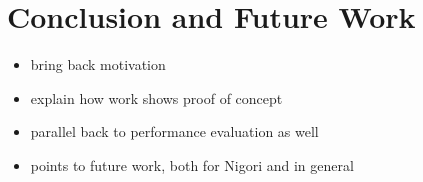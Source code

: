 \chapter{Conclusion and Future Work}

\begin{itemize}
  \item bring back motivation
  \item explain how work shows proof of concept
  \item parallel back to performance evaluation as well
  \item points to future work, both for Nigori and in general
\end{itemize}
